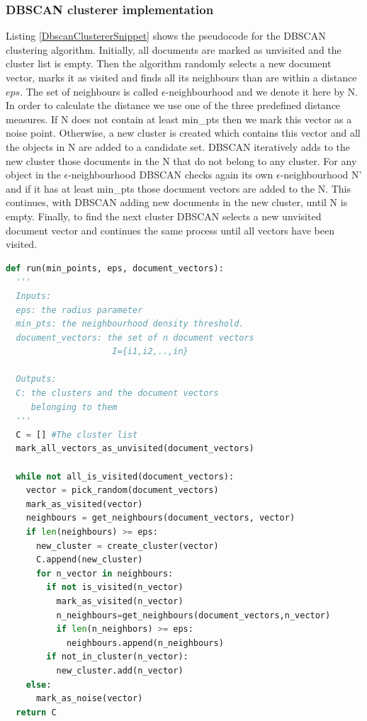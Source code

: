 \subsubsection{DBSCAN clusterer implementation}
Listing \ref{DbscanClustererSnippet} shows the pseudocode for the DBSCAN clustering algorithm. Initially,
all documents are marked as unvisited and the cluster list is empty. Then the algorithm randomly selects a new document vector, marks it as visited and finds all its neighbours than are within a distance $eps$. The set of neighbours is called $\epsilon$-neighbourhood and we denote it here by N. In order to calculate the distance we use one of the three predefined distance measures. If N does not contain at least min\_pts then we mark this vector as a noise point. Otherwise, a new cluster is created which contains this vector and all the objects in N are added to a candidate set. DBSCAN iteratively adds to the new cluster those documents in the N that do not belong to any cluster. For any object in the $\epsilon$-neighbourhood DBSCAN checks again its own $\epsilon$-neighbourhood N' and if it has at least min\_pts those document vectors are added to the N. This continues, with DBSCAN adding new documents in the new cluster, until N is empty. Finally, to find the next cluster DBSCAN selects a new unvisited document vector and continues the same process until all vectors have been visited.  

\begin{lstlisting}[language=Python, label=DbscanClustererSnippet, caption=Pseudocode for DBSCAN algorithm]
def run(min_points, eps, document_vectors):
  '''
  Inputs: 
  eps: the radius parameter
  min_pts: the neighbourhood density threshold.
  document_vectors: the set of n document vectors 
                     I={i1,i2,..,in}
  
  Outputs:
  C: the clusters and the document vectors 
     belonging to them
  '''
  C = [] #The cluster list
  mark_all_vectors_as_unvisited(document_vectors)
  
  while not all_is_visited(document_vectors):  
    vector = pick_random(document_vectors)
    mark_as_visited(vector)
    neighbours = get_neighbours(document_vectors, vector)
    if len(neighbours) >= eps:
      new_cluster = create_cluster(vector) 
      C.append(new_cluster)
      for n_vector in neighbours:
        if not is_visited(n_vector) 
          mark_as_visited(n_vector)
          n_neighbours=get_neighbours(document_vectors,n_vector)
          if len(n_neighbors) >= eps:
            neighbours.append(n_neighbours)
        if not_in_cluster(n_vector):
          new_cluster.add(n_vector)
    else:
      mark_as_noise(vector) 
  return C
\end{lstlisting}
